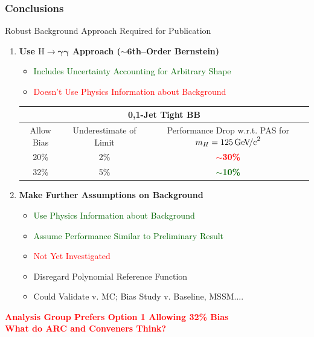 \documentclass{beamer}
\newcommand{\hgamgam}{\ensuremath{\mathrm{H} \rightarrow \gamma\gamma}}
\newcommand{\GeVcc}{\ensuremath{\,\mathrm{Ge\kern -0.1em V\!/c}^2}}
\newcommand{\tred}[1]{\textcolor{red}{#1}}
\newcommand{\tgreen}[1]{\textcolor{darkgreen}{#1}}
\newcommand{\tredbf}[1]{\textcolor{red}{\bf #1}}
\newcommand{\tgreenbf}[1]{\textcolor{darkgreen}{\bf #1}}
\begin{document}
\begin{frame}
\frametitle{Conclusions}
\small
  Robust Background Approach Required for Publication
  \begin{enumerate}
\small
    \item \textbf{Use $\bm{\hgamgam{}}$ Approach ($\bm{\sim6}$th--Order Bernstein)}
    \begin{itemize}
      \item \tgreen{Includes Uncertainty Accounting for Arbitrary Shape}
      \item \tred{Doesn't Use Physics Information about Background}%
    \end{itemize}
{\tiny
\begin{tabular}{|c|c|c|} \hline 
\multicolumn{3}{|c|}{ \bf 0,1-Jet Tight BB} \\ \hline
Allow Bias & Underestimate of Limit & Performance Drop w.r.t. PAS for $m_H=125\GeVcc{}$ \\ \hline
20\%  & 2\%  & \tredbf{$\sim$30\%}  \\ \hline
32\%  & 5\%  & \tgreenbf{$\sim$10\%} \\ \hline
\end{tabular}
}
    \item \textbf{Make Further Assumptions on Background}
    \begin{itemize}
      \item \tgreen{Use Physics Information about Background}
      \item \tgreen{Assume Performance Similar to Preliminary Result}
      \item \tred{Not Yet Investigated}
      \item Disregard Polynomial Reference Function
      \item Could Validate v. MC; Bias Study v. Baseline, MSSM....
    \end{itemize}
  \end{enumerate}
\begin{center}
\vspace{-1ex}
\tredbf{
Analysis Group Prefers Option 1 Allowing 32\% Bias
\\
What do ARC and Conveners Think?
}
\end{center}
\end{frame}
\end{document}
